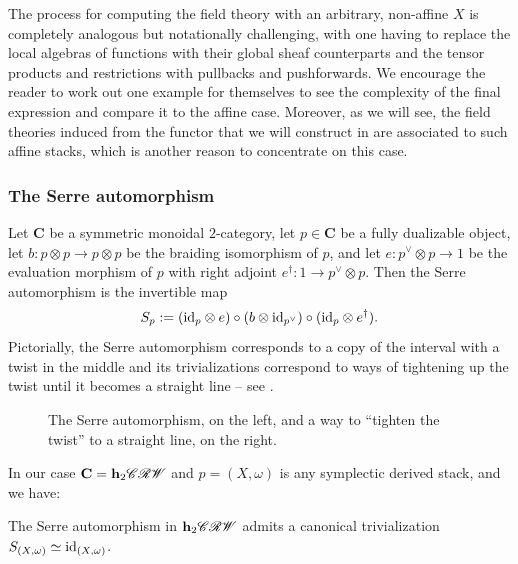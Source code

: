 The process for computing the field theory with an arbitrary, non-affine $X$ is completely analogous but notationally challenging, with one having to replace the local algebras of functions with their global sheaf counterparts and the tensor products and restrictions with pullbacks and pushforwards. We encourage the reader to work out one example for themselves to see the complexity of the final expression and compare it to the affine case. Moreover, as we will see, the field theories induced from the functor that we will construct in  are associated to such affine stacks, which is another reason to concentrate on this case.

\subsubsection{The Serre automorphism}

Let $\mathbf{C}$ be a symmetric monoidal $2$-category, let $p \in \mathbf{C}$ be a fully dualizable object, let $b : p \otimes p \to p \otimes p$ be the braiding isomorphism of $p$, and let $e : p^\vee \otimes p \to 1$ be the evaluation morphism of $p$ with right adjoint $e^\dagger : 1 \to p^\vee \otimes p$. Then the Serre automorphism is the invertible map
\begin{equation*}
	S_p := (\mathrm{id}_p \otimes e) \circ (b \otimes \mathrm{id}_{p^\vee}) \circ (\mathrm{id}_p \otimes e^\dagger).
\end{equation*}
Pictorially, the Serre automorphism corresponds to a copy of the interval with a twist in the middle and its trivializations correspond to ways of tightening up the twist until it becomes a straight line -- see .
\begin{figure}[ht]
	\centering
	
	\hspace{4em}
	
	\caption{The Serre automorphism, on the left, and a way to ``tighten the twist'' to a straight line, on the right.}
	\label{fig:serre}
\end{figure}

In our case $\mathbf{C} = \mathbf{h}_2 \mathscr{CRW}$ and $p = (X, \omega)$ is any symplectic derived stack, and we have:

\begin{prp} \label{prp:serre-trivial}
	The Serre automorphism in $\mathbf{h}_2 \mathscr{CRW}$ admits a canonical trivialization $S_{(X, \omega)} \simeq \mathrm{id}_{(X, \omega)}$.
\end{prp}

